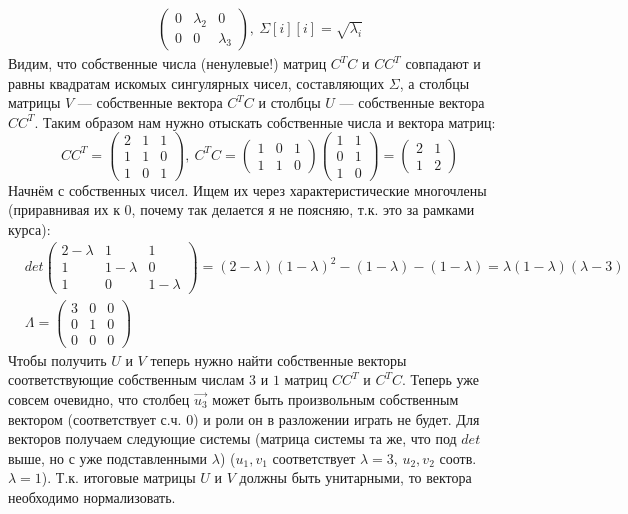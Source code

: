 \begin{solution}
\begin{enumerate}
\begin{align*}
\begin{pmatrix}
			0 & \lambda_2 & 0 \\
			0 & 0 & \lambda_3
		\end{pmatrix},
		\ \Sigma[i][i] = \sqrt{\lambda_i}
	\end{align*}
	Видим, что собственные числа (ненулевые!) матриц $C^TC$ и $CC^T$ совпадают и равны квадратам искомых сингулярных чисел, составляющих $\Sigma$, а столбцы матрицы $V$ --- собственные вектора $C^TC$ и столбцы $U$ --- собственные вектора $CC^T$.
	Таким образом нам нужно отыскать собственные числа и вектора матриц:
	\begin{equation*}
	CC^T=
	\begin{pmatrix}
	2 & 1 & 1 \\
	1 & 1 & 0 \\
	1 & 0 & 1 
	\end{pmatrix},\
	C^TC=
	\begin{pmatrix}
	1 & 0 & 1 \\
	1 & 1 & 0 
	\end{pmatrix}
	\begin{pmatrix}
	1 & 1 \\
	0 & 1 \\
	1 & 0
	\end{pmatrix}
	=
	\begin{pmatrix}
	2 & 1 \\
	1 & 2 
	\end{pmatrix}
	\end{equation*}
	Начнём с собственных чисел. Ищем их через характеристические многочлены (приравнивая их к $0$, почему так делается я не поясняю, т.к. это за рамками курса):
	\begin{align*}
	&det
	\begin{pmatrix}
	2 - \lambda & 1 & 1 \\
	1 & 1 - \lambda & 0 \\
	1 & 0 & 1 - \lambda
	\end{pmatrix}
	= (2-\lambda)(1-\lambda)^2-(1-\lambda)-(1-\lambda)=\lambda(1-\lambda)(\lambda-3)
	 \\
	&\Lambda = 
	\begin{pmatrix}
	3 & 0 & 0 \\
	0 & 1 & 0 \\
	0 & 0 & 0
	\end{pmatrix}
	\end{align*}
	Чтобы получить $U$ и $V$ теперь нужно найти собственные векторы соответствующие собственным числам $3$ и $1$ матриц 
	$CC^T$ и $C^TC$. Теперь уже совсем очевидно, что столбец $\vec{u_3}$ может быть произвольным собственным вектором (соответствует с.ч. $0$) и роли он в разложении играть не будет. Для векторов получаем следующие системы (матрица системы та же, что под $det$ выше, но с уже подставленными $\lambda$) ($u_1, v_1$ соответствует $\lambda = 3$, $u_2, v_2$ соотв. $\lambda = 1$). Т.к. итоговые матрицы $U$ и $V$ должны быть унитарными, то вектора необходимо нормализовать.

\end{enumerate}
\end{solution}
